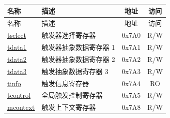 \begin{longtable}{ | p{4.0cm} | p{8.4cm} | c | c| }
\hline\rowcolor{lightgray}
名称 & 描述 & 地址 & 访问 \\ \hline
\endfirsthead
\hline
\rowcolor{lightgray}
名称 & 描述 & 地址 & 访问  \\
\hline
\endhead
\endfoot

\hyperref[regdesc:TSELECT]{tselect} & 触发器选择寄存器 & 0x7A0 & R/W \\\hline
\hyperref[regdesc:TDATA1]{tdata1} & 触发器抽象数据寄存器 1 & 0x7A1 & R/W \\\hline
\hyperref[regdesc:TDATA2]{tdata2} & 触发器抽象数据寄存器 2 & 0x7A2 & R/W \\\hline
\hyperref[regdesc:TDATA3]{tdata3} & 触发抽象数据寄存器 3 & 0x7A3 & R/W \\\hline
\hyperref[regdesc:TINFO]{tinfo} & 触发信息寄存器 & 0x7A4 & RO \\\hline
\hyperref[regdesc:TCONTROL]{tcontrol} & 全局触发控制寄存器 & 0x7A5 & R/W \\\hline
\hyperref[regdesc:MCONTEXT]{mcontext} & 触发上下文寄存器 & 0x7A8 & R/W \\\hline
\end{longtable}
